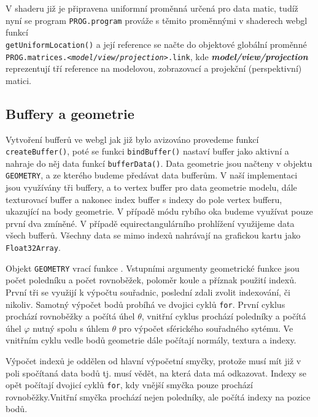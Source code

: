 V shaderu již je připravena uniformní proměnná určená pro data matic, tudíž nyní se program \texttt{PROG.program} prováže s těmito proměnnými v shaderech webgl funkcí \\\texttt{getUniformLocation()} a její reference se načte do objektové globální proměnné \\\texttt{PROG.matrices.\textit{<model/view/projection>}.link}, kde \textit{\textbf{model/view/projection}} reprezentují tří reference na modelovou, zobrazovací a projekční (perspektivní) matici.


\newpage


\subsection{Buffery a geometrie}

Vytvoření bufferů ve webgl jak již bylo avizováno provedeme funkcí \texttt{createBuffer()}, poté se funkci   \texttt{bindBuffer()}  nastaví buffer jako  aktivní  a  nahraje do něj  data    funkcí \texttt{bufferData()}. Data geometrie jsou načteny v objektu \texttt{GEOMETRY}, a ze kterého  budeme předávat data bufferům. V naší implementaci jsou využívány tři buffery, a to vertex buffer pro data geometrie modelu, dále texturovací buffer a nakonec index buffer s indexy do pole vertex bufferu, ukazující na body geometrie. V případě módu rybího oka budeme využívat pouze první dva zmíněné. V případě equirectangulárního prohlížení využijeme data všech bufferů. Všechny data se mimo indexů nahrávají na grafickou kartu jako \texttt{Float32Array}.


Objekt \texttt{GEOMETRY} vrací funkce \texttt{\createSphereGeometry}. Vstupními argumenty geometrické funkce jsou počet poledníku a počet rovnoběžek, poloměr koule a příznak použití indexů. První tři se využijí k výpočtu souřadnic, poslední zdali zvolit indexování, či nikoliv. Samotný výpočet bodů probíhá ve dvojici cyklů \texttt{for}. První cyklus prochází rovnoběžky a počítá úhel $\theta$, vnitřní cyklus prochází poledníky a počítá úhel $\varphi$ nutný spolu s úhlem $\theta$ pro výpočet sférického souřadného sytému. Ve vnitřním cyklu vedle bodů geometrie dále počítají normály, textura a indexy.


Výpočet indexů je oddělen od hlavní výpočetní smyčky, protože musí mít již v poli spočítaná data bodů tj. musí vědět, na která data má odkazovat. Indexy se opět počítají dvojicí cyklů \texttt{for}, kdy vnější smyčka pouze prochází rovnoběžky.Vnitřní smyčka prochází nejen poledníky, ale počítá indexy na pozice bodů.

